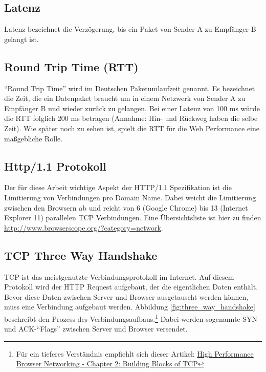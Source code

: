 

	\subsection{Latenz} %
	\label{sub:latenz}
		Latenz bezeichnet die Verzögerung, bis ein Paket von Sender A zu Empfänger B gelangt ist.


	\subsection{Round Trip Time (RTT)} %
	\label{sub:round_trip_time_}
		"`Round Trip Time"' wird im Deutschen Paketumlaufzeit genannt. Es bezeichnet die Zeit, die ein Datenpaket braucht um in einem Netzwerk von Sender A zu Empfänger B und wieder zurück zu gelangen. Bei einer Latenz von 100 ms würde die RTT folglich 200 ms betragen (Annahme: Hin- und Rückweg haben die selbe Zeit). Wie später noch zu sehen ist, spielt die RTT für die Web Performance eine maßgebliche Rolle.
	


	\subsection{Http/1.1 Protokoll}
	\label{sub:http_1_1_Protokoll}
		Der für diese Arbeit wichtige Aspekt der HTTP/1.1 Spezifikation ist die Limitierung von Verbindungen pro Domain Name. Dabei weicht die Limitierung zwischen den Browsern ab und reicht von 6 (Google Chrome) bis 13 (Internet Explorer 11) parallelen TCP Verbindungen. Eine Übersichtsliste ist hier zu finden \url{http://www.browserscope.org/?category=network}.


	\subsection{TCP Three Way Handshake}
	\label{sub:tcp_three_way_handshake}
		TCP ist das meistgenutzte Verbindungsprotokoll im Internet. Auf diesem Protokoll wird der HTTP Request aufgebaut, der die eigentlichen Daten enthält.
		Bevor diese Daten zwischen Server und Browser ausgetauscht werden können, muss eine Verbindung aufgebaut werden. Abbildung \ref{fig:three_way_handshake} beschreibt den Prozess des Verbindungsaufbaus.\footnote{Für ein tieferes Verständnis empfiehlt sich dieser Artikel: \href{http://chimera.labs.oreilly.com/books/1230000000545/ch02.html}{High Performance Browser Networking - Chapter 2: Building Blocks of TCP}} Dabei werden sogenannte SYN- und ACK-"`Flags"' zwischen Server und Browser versendet.

